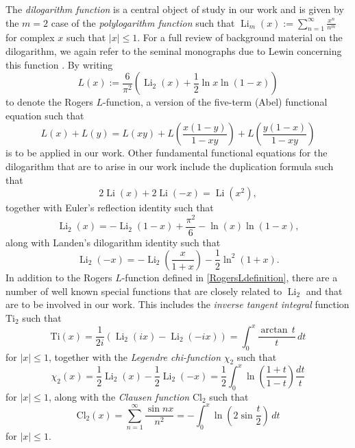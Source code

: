 \documentclass[12pt]{article}
\begin{document}
 The \emph{dilogarithm function} is a central object of study in our work and is given by the $m = 2$ case of the 
 \emph{polylogarithm function} such that $\operatorname{Li}_{m}(x) := \sum_{n=1}^{\infty} \frac{x^{n}}{n^m}$ for complex $x$ 
 such that $|x| \leq 1$. For a full review of background material on the dilogarithm, we again refer to the seminal monographs due to 
 Lewin concerning this function \cite{Lewin1958,Lewin1981,Lewin1991text}. By writing 
\begin{equation}\label{RogersLdefinition}
 L(x) := \frac{6}{\pi^2} \left( \operatorname{Li}_{2}(x) + \frac{1}{2} \ln x \ln(1-x) \right) 
\end{equation}
 to denote the Rogers $L$-function, a version of the five-term (Abel) functional equation such that $$ L(x) + L(y) = L(x y) + 
 L\left( \frac{x(1-y)}{1- x y} \right) + L\left( \frac{y(1-x)}{1-xy} \right) $$ is to be applied in our work. Other fundamental functional 
 equations for the dilogarithm that are to arise in our work include the duplication formula such that 
\begin{equation}\label{duplicationformula}
 2 \operatorname{Li}(x) + 2 \operatorname{Li}(-x) = \operatorname{Li}(x^{2}), 
\end{equation}
 together with Euler's reflection identity such that 
\begin{equation}\label{Eulerreflectionidentity}
 \operatorname{Li}_2(x) = -\operatorname{Li}_2(1 - x) + \frac{\pi^2}{6} - \ln(x) \ln(1 - x), 
\end{equation}
 along with Landen's dilogarithm identity such that 
\begin{equation}\label{Landenformula}
 \operatorname{Li}_{2}(-x) = -\operatorname{Li}_{2}\left( \frac{x}{1+x} \right) - \frac{1}{2} \ln^2(1+x). 
\end{equation}
 In addition to the Rogers $L$-function defined in \eqref{RogersLdefinition}, there are a number of well known special functions that 
 are closely related to $\operatorname{Li}_{2}$ and that are to be involved in our work. This includes the \emph{inverse tangent integral} 
 function $\text{Ti}_{2}$ \cite[\S2]{Lewin1981} such that $$ \text{Ti}(x) = \frac{1}{2i} \left( \operatorname{Li}_{2}(i 
 x) - \operatorname{Li}_{2}(-ix) \right) = \int_{0}^{x} \frac{ \operatorname{arctan} \, t}{t} \, dt$$ for $|x| \leq 1$, together with the 
 \emph{Legendre chi-function} $\chi_2$ \cite[\S1.8]{Lewin1981} such that $$ \chi_{2}(x) = \frac{1}{2} \operatorname{Li}_{2}(x) - 
 \frac{1}{2} \operatorname{Li}_{2}(-x) = \frac{1}{2} \int_{0}^{x} \ln\left( \frac{1+t}{1-t} \right) \frac{dt}{t} $$ for $|x| \leq 1$, along with 
 the \emph{Clausen function} $\text{Cl}_{2}$ \cite[\S4]{Lewin1981} such that $$ \text{Cl}_{2}(x) = \sum_{n=1}^{\infty} \frac{\sin n 
 x}{n^2} = -\int_{0}^{x} \ln\left( 2 \sin \frac{t}{2} \right) \, dt $$ for $|x| \leq 1$. 
\end{document}
